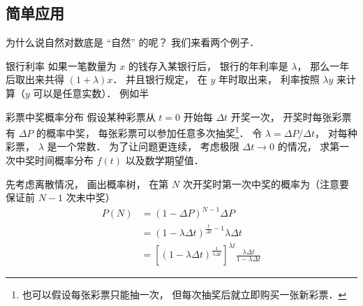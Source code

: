 \subsection{简单应用}
为什么说自然对数底是 “自然” 的呢？ 我们来看两个例子．

\begin{example}{银行利率}
如果一笔数量为 $x$ 的钱存入某银行后， 银行的年利率是 $\lambda$， 那么一年后取出来共得 $(1+\lambda)x$． 并且银行规定， 在 $y$ 年时取出来， 利率按照 $\lambda y$ 来计算（$y$ 可以是任意实数）． 例如半
\end{example}

\begin{example}{彩票中奖概率分布}
假设某种彩票从 $t = 0$ 开始每 $\Delta t$ 开奖一次， 开奖时每张彩票有 $\Delta P$ 的概率中奖， 每张彩票可以参加任意多次抽奖\footnote{也可以假设每张彩票只能抽一次， 但每次抽奖后就立即购买一张新彩票．}． 令 $\lambda = {\Delta P}/{\Delta t}$， 对每种彩票， $\lambda$ 是一个常数． 为了让问题更连续， 考虑极限 $\Delta t\to 0$ 的情况， 求第一次中奖时间概率分布 $f(t)$ 以及数学期望值．

先考虑离散情况， 画出概率树， 在第 $N$ 次开奖时第一次中奖的概率为（注意要保证前 $N-1$ 次未中奖）
\begin{equation}
\begin{aligned}
P(N) &= (1-\Delta P)^{N-1} \Delta P\\
&= (1-\lambda\Delta t)^{\frac{t}{\Delta t}-1} \lambda\Delta t\\
&= [(1-\lambda\Delta t)^{\frac{1}{\lambda\Delta t}}]^{\lambda t} \frac{\lambda\Delta t}{1-\lambda\Delta t}
\end{aligned}
\end{equation}


\end{example}
